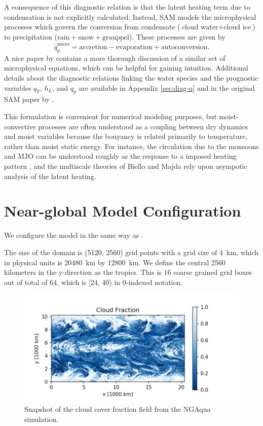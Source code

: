 \documentclass{report}
\newcommand{\1}[1]{\mathds{1}\left[#1\right]}
\begin{document}
A consequence of this diagnostic relation is that the latent
heating term due to condensation is not explicitly calculated. Instead, SAM
models the microphysical processes which govern the conversion from condensate
($\text{cloud water} + \text{cloud ice}$) to precipitation ($\text{rain} +
\text{snow} + \text{grauppel}$). These processes are given by
\[
  \dot{q}_p^{\text{micro}} = \text{accretion} - \text{evaporation} + \text{autoconversion}.
\]
A nice paper by \textcite{hernandez-duenas_minimal_2013} contains a more thorough
discussion of a similar set of microphysical equations, which can be helpful for
gaining intuition. Additional details about the diagnostic relations linking the
water species and the prognostic variables $q_T$, $h_L$, and $q_p$ are available
in Appendix \ref{sec:diag-q} and in the original SAM paper by \textcite{Khairoutdinov2003}.

This formulation is convenient for numerical modeling purposes, but
moist-convective processes are often understood as a coupling between dry
dynamics and moist variables because the bouyancy is related primarily to
temperature, rather than moist static energy.
For instance, the circulation due to the monsoons and MJO can be understood
roughly as the response to a imposed heating pattern \autocite{Gill1980}, and
the multiscale theories of Biello and Majda rely upon asympotic analysis of the
latent heating.

\section{Near-global Model Configuration}
\label{sec:model-config}

We configure the model in the same way as \textcite{Bretherton2015}. 

The size of the domain is (5120, 2560) grid points with a grid size of
\SI{4}{\km}, which in physical units is \SI{20480}{\km} by \SI{12800}{\km}.
We define the central 2560 kilometers in the y-direction as the tropics. 
This is 16 coarse grained grid boxes out of total of 64, which is [24, 40) in
0-indexed notation.

\begin{figure}[ht]
  \centering
  \includegraphics{images/cld.png}
  \caption{\label{fig:cld}Snapshot of the cloud cover fraction field from the NGAqua simulation.}
\end{figure}
\end{document}
